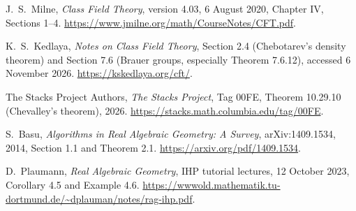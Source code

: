 J.~S.~Milne, \emph{Class Field Theory}, version 4.03,
6 August 2020, Chapter IV, Sections 1--4.
\url{https://www.jmilne.org/math/CourseNotes/CFT.pdf}.

K.~S.~Kedlaya, \emph{Notes on Class Field Theory},
Section 2.4 (Chebotarev's density theorem) and Section 7.6
(Brauer groups, especially Theorem 7.6.12), accessed
6 November 2026.
\url{https://kskedlaya.org/cft/}.

The Stacks Project Authors, \emph{The Stacks Project},
Tag 00FE, Theorem 10.29.10 (Chevalley's theorem), 2026.
\url{https://stacks.math.columbia.edu/tag/00FE}.

S.~Basu, \emph{Algorithms in Real Algebraic Geometry:
A Survey}, arXiv:1409.1534, 2014, Section 1.1 and Theorem 2.1.
\url{https://arxiv.org/pdf/1409.1534}.

D.~Plaumann, \emph{Real Algebraic Geometry},
IHP tutorial lectures, 12 October 2023,
Corollary 4.5 and Example 4.6.
\url{https://wwwold.mathematik.tu-dortmund.de/~dplauman/notes/rag-ihp.pdf}.
